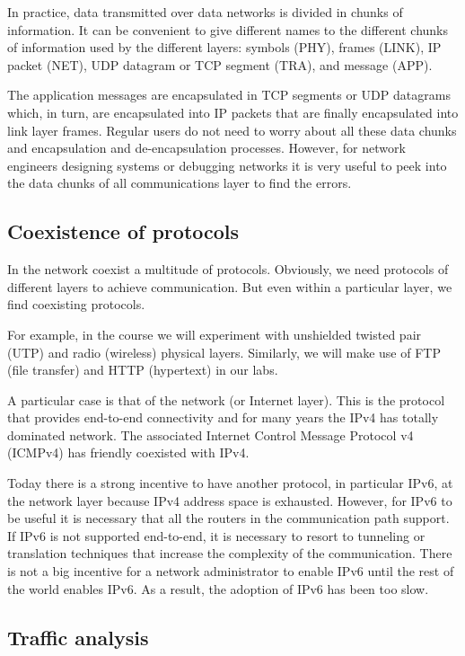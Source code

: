 In practice, data transmitted over data networks is divided in chunks of information.
It can be convenient to give different names to the different chunks of information used by the different layers: symbols (PHY), frames (LINK), IP packet (NET), UDP datagram or TCP segment (TRA), and message (APP).

The application messages are encapsulated in TCP segments or UDP datagrams which, in turn, are encapsulated into IP packets that are finally encapsulated into link layer frames.
Regular users do not need to worry about all these data chunks and encapsulation and de-encapsulation processes.
However, for network engineers designing systems or debugging networks it is very useful to peek into the data chunks of all communications layer to find the errors.

\subsection{Coexistence of protocols}

In the network coexist a multitude of protocols.
Obviously, we need protocols of different layers to achieve communication.
But even within a particular layer, we find coexisting protocols.

For example, in the course we will experiment with unshielded twisted pair (UTP) and radio (wireless) physical layers.
Similarly, we will make use of FTP (file transfer) and HTTP (hypertext) in our labs.

A particular case is that of the network (or Internet layer).
This is the protocol that provides end-to-end connectivity and for many years the IPv4 has totally dominated network.
The associated Internet Control Message Protocol v4 (ICMPv4) has friendly coexisted with IPv4.

Today there is a strong incentive to have another protocol, in particular IPv6, at the network layer because IPv4 address space is exhausted.
However, for IPv6 to be useful it is necessary that all the routers in the communication path support.
If IPv6 is not supported end-to-end, it is necessary to resort to tunneling or translation techniques that increase the complexity of the communication.
There is not a big incentive for a network administrator to enable IPv6 until the rest of the world enables IPv6.
As a result, the adoption of IPv6 has been too slow.

\subsection{Traffic analysis}

